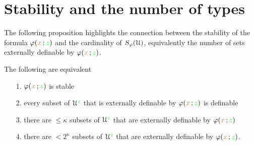   
  
  
  


\section{Stability and the number of types}


The following proposition highlights the connection between the stability of the formula $\varphi({\color{brown} x}\,;{\color{green} z})$ and the cardinality of $S_\varphi(\EuScript U)$, equivalently the number of sets externally definable by $\varphi({\color{brown} x}\,;{\color{green} z})$. 

\begin{theorem}\label{thm_def_stable_formula2}
   The following are equivalent
   \begin{itemize}
     \item[1.] $\varphi({\color{brown} x}\,;{\color{green} z})$ is stable
     \item[2.] every subset of $\EuScript U^{\color{green} z}$ that is externally definable by $\varphi({\color{brown} x}\,;{\color{green} z})$ is definable
     \item[3.] there are $\le\kappa$ subsets of $\EuScript U^{\color{green} z}$ that are externally definable by $\varphi({\color{brown} x}\,;{\color{green} z})$
     \item[4.] there are $<2^\kappa$ subsets of $\EuScript U^{\color{green} z}$ that are externally definable by $\varphi({\color{brown} x}\,;{\color{green} z})$.
   \end{itemize}
 \end{theorem}
 
